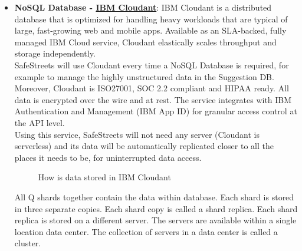 \begin{itemize}
	\item \textbf{NoSQL Database - \href{https://cloud.ibm.com/catalog/services/cloudant}{IBM Cloudant}}: IBM Cloudant is a distributed database that is optimized for handling heavy workloads that are typical of large, fast-growing web and mobile apps. Available as an SLA-backed, fully managed IBM Cloud service, Cloudant elastically scales throughput and storage independently.
	\\SafeStreets will use Cloudant every time a NoSQL Database is required, for example to manage the highly unstructured data in the Suggestion DB.
	Moreover, Cloudant is ISO27001, SOC 2.2 compliant and HIPAA ready. All data is encrypted over the wire and at rest. The service integrates with IBM Authentication and Management (IBM App ID) for granular access control at the API level.
	\\Using this service, SafeStreets will not need any server (Cloudant is serverless) and its data will be automatically replicated closer to all the places it needs to be, for uninterrupted data access.
	\begin{figure}[h!]
		\caption{How is data stored in IBM Cloudant}
	\end{figure}
	\FloatBarrier
	All Q shards together contain the data within database. Each shard is stored in three separate copies. Each shard copy is called a shard replica. Each shard replica is stored on a different server. The servers are available within a single location data center. The collection of servers in a data center is called a cluster.
	\begin{figure}[h!]

\end{figure}
\end{itemize}
